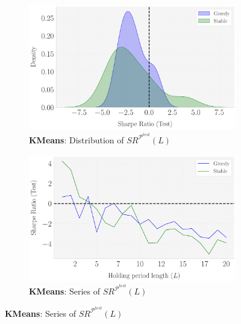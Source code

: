 \begin{figure}[H]
  \centering
  \caption{Sensitivity of $SR^{\mathcal P^{test}}$ to the holding window length ($L$)}
    \begin{subfigure}[b]{0.44\textwidth}
    \centering
    \includegraphics[width=\textwidth]{fig_8a_KMeans_RobustnessCheck_SR_Test_Set_Distribution_[Change_L].pdf}
    \caption{\textbf{KMeans}: Distribution of $SR^{\mathcal P^{test}}(L)$}
    \label{fig:KMeans_Robustness_L_Distr}
  \end{subfigure}
  \hspace{0.05\textwidth} %
  \begin{subfigure}[b]{0.44\textwidth}
    \centering
    \includegraphics[width=\textwidth]{fig_8b_KMeans_RobustnessCheck_SR_Test_Set_vs_L_[Change_L].pdf}
    \caption{\textbf{KMeans}: Series of $SR^{\mathcal P^{test}}(L)$}
    \label{fig:KMeans_Robustness_L_Series}
  \end{subfigure}
  

\end{figure}
